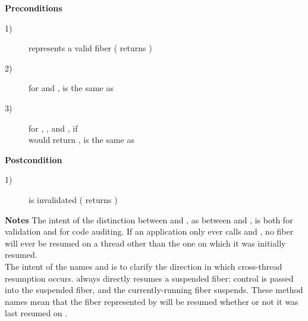 {\bfseries Preconditions}
\begin{description}
    \item[1)]  represents a valid fiber ( returns )
    \item[2)] for \resume and \resumewith, \currthread is the same as
              \lastthread
    \item[3)] for \resume, \resumewith, \xtresume and \xtresumewith, if\\
              \canxtresume would return , \currthread is
              the same as \lastthread
\end{description}

{\bfseries Postcondition}
\begin{description}
    \item[1)]  is invalidated ( returns )
\end{description}

{\bfseries Notes}
\newline
The intent of the distinction between \resume and \xtresume, as
between \resumewith and \xtresumewith, is both for validation and for code
auditing. If an application only ever calls \resume and \resumewith, no fiber
will ever be resumed on a thread other than the one on which it was initially
resumed.\\

The intent of the names \xtresume and \xtresumewith is to clarify the
direction in which cross-thread resumption occurs. \Currthread always
directly resumes a suspended fiber: control is passed into the suspended
fiber, and the currently-running fiber suspends. These method names mean that
the fiber represented by  will be resumed whether or not it was
last resumed on \currthread.\\

